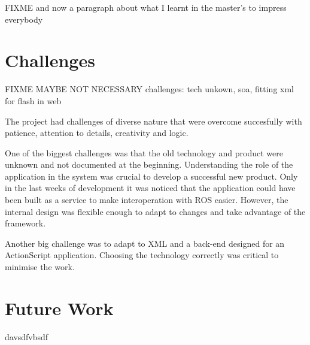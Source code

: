 FIXME and now a paragraph about what I learnt in the master's to impress everybody

\section{Challenges}
 FIXME MAYBE NOT NECESSARY
challenges: tech unkown, soa, fitting xml for flash in web

The project had challenges of diverse nature that were overcome succesfully with patience, attention to details, creativity and logic.

One of the biggest challenges was that the old technology and product were unknown and not documented at the beginning.
Understanding the role of the application in the system was crucial to develop a successful new product.
Only in the last weeks of development it was noticed that the application could have been built as a service to make interoperation with ROS easier.
However, the internal design was flexible enough to adapt to changes and take advantage of the framework.

Another big challenge was to adapt to \ac{XML} and a back-end designed for an ActionScript application.
Choosing the technology correctly was critical to minimise the work.




\section{Future Work}

davsdfvbsdf